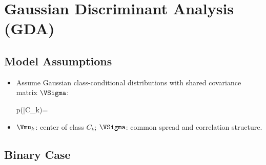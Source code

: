 \section*{Gaussian Discriminant Analysis (GDA)}

\subsection*{Model Assumptions}

\begin{itemize}
    \item Assume Gaussian class-conditional distributions with \alert{shared covariance matrix} $\VSigma$:
    \begin{myequation}
    p(\x|C_{k})=
    \end{myequation}
    \item $\Vmu_k$: center of class $C_k$; $\VSigma$: common spread and correlation structure.
\end{itemize}

\subsection*{Binary Case}


